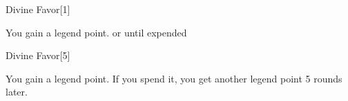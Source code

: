\begin{spellsection}{Divine Favor}[1]
    \begin{spellheader}
    \end{spellheader}
    \begin{spellcontent}
        \begin{spelltargetinginfo}
        \end{spelltargetinginfo}
        \begin{spelleffects}
            \spelleffect You gain a legend point.
            \spelldur \durshort or until expended
        \end{spelleffects}
    \end{spellcontent}
    \begin{spellfooter}
        \miscastexplode
    \end{spellfooter}
\end{spellsection}

\begin{spellsection}[Greater]{Divine Favor}[5]
    \begin{spellheader}
    \end{spellheader}
    \begin{spellcontent}
        \begin{spelltargetinginfo}
        \end{spelltargetinginfo}
        \begin{spelleffects}
            \spelleffect You gain a legend point. If you spend it, you get another legend point 5 rounds later.
            \spelldur \durlong \dismissable
        \end{spelleffects}
    \end{spellcontent}
    \begin{spellfooter}
        \miscastexplode
    \end{spellfooter}
\end{spellsection}

